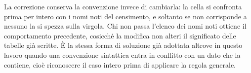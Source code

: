 La correzione conserva la convenzione invece di cambiarla: la cella si confronta prima per intero con i nomi noti del censimento, e soltanto se non corrisponde a nessuno la si spezza sulla virgola. Chi non passa l'elenco dei nomi noti ottiene il comportamento precedente, cosicché la modifica non alteri il significato delle tabelle già scritte. È la stessa forma di soluzione già adottata altrove in questo lavoro quando una convenzione sintattica entra in conflitto con un dato che la contiene, cioè riconoscere il caso intero prima di applicare la regola generale.
